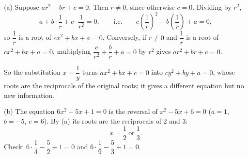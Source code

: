 (a) Suppose $ar^2+br+c=0$. Then $r\ne0$, since otherwise $c=0$. Dividing by $r^2$,
\[
a+b\cdot\dfrac{1}{r}+c\cdot\dfrac{1}{r^2}=0,\qquad\text{i.e.}\qquad c\left(\dfrac{1}{r}\right)^2+b\left(\dfrac{1}{r}\right)+a=0,
\]
so $\dfrac{1}{r}$ is a root of $cx^2+bx+a=0$. Conversely, if $r\ne0$ and $\dfrac{1}{r}$ is a root of $cx^2+bx+a=0$, multiplying $\dfrac{c}{r^2}+\dfrac {b}{r}+a=0$ by $r^2$ gives $ar^2+br+c=0$.

So the substitution $x=\dfrac{1}{y}$ turns $ax^2+bx+c=0$ into $cy^2+by+a=0$, whose roots are the reciprocals of the original roots; it gives a different equation but no new information.

(b) The equation $6x^2-5x+1=0$ is the reversal of $x^2-5x+6=0$ ($a=1$, $b=-5$, $c=6$). By (a) its roots are the reciprocals of $2$ and $3$:
\[
x=\boxed{\dfrac{1}{2}\ \text{or}\ \dfrac{1}{3}}.
\]
Check: $6\cdot\dfrac{1}{4}-\dfrac{5}{2}+1=0$ and $6\cdot\dfrac{1}{9}-\dfrac{5}{3}+1=0$.
